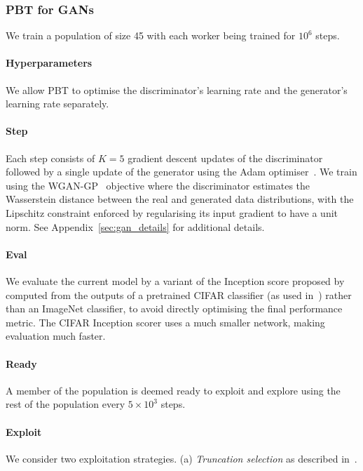 \subsubsection{PBT for GANs}
We train a population of size 45 with each worker being trained for $10^6$ steps. 
\vspace{-0.5em}\paragraph{Hyperparameters}We allow PBT to optimise the discriminator's learning rate and the generator's learning rate separately. 
\vspace{-0.5em}\paragraph{Step}Each step consists of $K=5$ gradient descent updates of the discriminator followed by a single update of the generator
using the Adam optimiser~\citep{adam}.
We train using the WGAN-GP~\citep{improvedwgan} objective where the discriminator estimates the Wasserstein distance between the real and generated data distributions, with the Lipschitz constraint enforced by regularising its input gradient to have a unit norm.
See Appendix~\ref{sec:gan_details} for additional details. 
\vspace{-0.5em}\paragraph{Eval}We evaluate the current model by a variant of the Inception score proposed by~\citet{openaigan}
computed from the outputs of a pretrained CIFAR classifier (as used in~\citet{mihaelaalphagan})
rather than an ImageNet classifier,
to avoid directly optimising the final performance metric.
The CIFAR Inception scorer uses a much smaller network, making evaluation much faster. 
\vspace{-0.5em}\paragraph{Ready}A member of the population is deemed ready to exploit and explore using the rest of the population every $5\times10^3$ steps. 
\vspace{-0.5em}\paragraph{Exploit}We consider two exploitation strategies.
(a) \emph{Truncation selection} as described in~.
